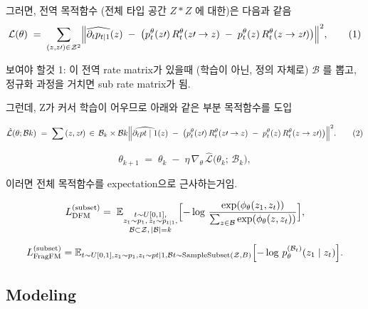 그러면, 전역 목적함수 (전체 타입 공간 $Z*Z$ 에 대한)은 다음과 같음
\[
\mathcal{L}(\theta)
\;=\;
\sum_{(z,z{\prime}) \in \mathcal{Z}^2}
\Bigl\|
\widehat{\partial_t p_{t\mid 1}}(z)
\;-\;
\bigl(
p_t^\theta(z{\prime})\,R_t^\theta(z{\prime}\to z)
\;-\;
p_t^\theta(z)\,R_t^\theta(z\to z{\prime})
\bigr)
\Bigr\|^2,
\tag{1}
\]



보여야 할것 1: 이 전역 rate matrix가 있을때 (학습이 아닌, 정의 자체로) $\mathcal{B}$ 를 뽑고, 정규화 과정을 거치면 sub rate matrix가 됨.




그런데, Z가 커서 학습이 어우므로 아래와 같은 부분 목적함수를 도입

\[
\hat{\mathcal{L}}(\theta;\mathcal{B}k)
\;=\;
\sum{
(z,z{\prime}) \,\in\, \mathcal{B}_k \times \mathcal{B}k
}
\Bigl\|
\widehat{\partial_t p{t\mid 1}}(z)
\;-\;
\bigl(
p_t^\theta(z{\prime})\,R_t^\theta(z{\prime}\to z)
\;-\;
p_t^\theta(z)\,R_t^\theta(z\to z{\prime})
\bigr)
\Bigr\|^2.
\tag{2}
\]

\[
\theta_{k+1}
\;=\;
\theta_k
\;-\;
\eta \,\nabla_\theta \,\hat{\mathcal{L}}\bigl(\theta_k;\,\mathcal{B}_k\bigr),
\tag{3}
\]

이러면 전체 목적함수를 expectation으로 근사하는거임.

\[
L_{\mathrm{DFM}}^{(\text{subset})}
=\;
\mathbb{E}_{ 
  \substack{
    t \sim U[0,1],\\
    z_1 \sim p_1,\,
    z_t \sim p_{t\mid 1},\\
    \mathcal{B}\subset \mathcal{Z},\,|\mathcal{B}|=k
  }
}
\Bigl[
  -\log\,
  \frac{
    \exp(\phi_\theta(z_1, z_t))
  }{
    \sum_{z \in \mathcal{B}}
    \exp(\phi_\theta(z, z_t))
  }
\Bigr],
\]


\[
L_{\mathrm{FragFM}}^{(\text{subset})} =
\mathbb{E}_{
\substack{
t \sim U[0,1], z_1 \sim p_1, z_t \sim p{t\mid 1}, \mathcal{B}t \sim \mathrm{SampleSubset}(\mathcal{Z}, B)
}
}
\Bigl[
-\log\, p_{\theta}^{(\mathcal{B}_t)}(z_1 \mid z_t)
\Bigr].
\]



\subsection{Modeling}
